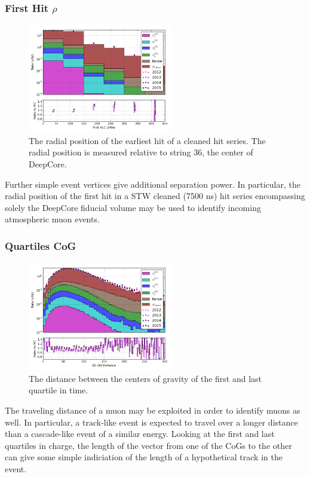 \subsubsection{First Hit $\rho$}
\begin{figure}[h]
	\centering
		\includegraphics[width=2.5in]{First_HLC_Rho_log.png}
		\caption[First Hit $\rho$ Position]{The radial position of the earliest hit of a cleaned hit series. The radial position is measured relative to string 36, the center of DeepCore.}
	\label{fig:firsthit_rho}
\end{figure}

Further simple event vertices give additional separation power. 
In particular, the radial position of the first hit in a STW cleaned (7500 ns) hit series encompassing solely the DeepCore fiducial volume may be used to identify incoming atmospheric muon events.


\subsubsection{Quartiles CoG}
\begin{figure}[h]
	\centering
		\includegraphics[width=2.5in]{Q1-Q4_Distance_log.png}
		\caption[Quartile Distance]{The distance between the centers of gravity of the first and last quartile in time.}
	\label{fig:quartile_distance}
\end{figure}

The traveling distance of a muon may be exploited in order to identify muons as well.
In particular, a track-like event is expected to travel over a longer distance than a cascade-like event of a similar energy.
Looking at the first and last quartiles in charge, the length of the vector from one of the CoGs to the other can give some simple indiciation of the length of a hypothetical track in the event.

